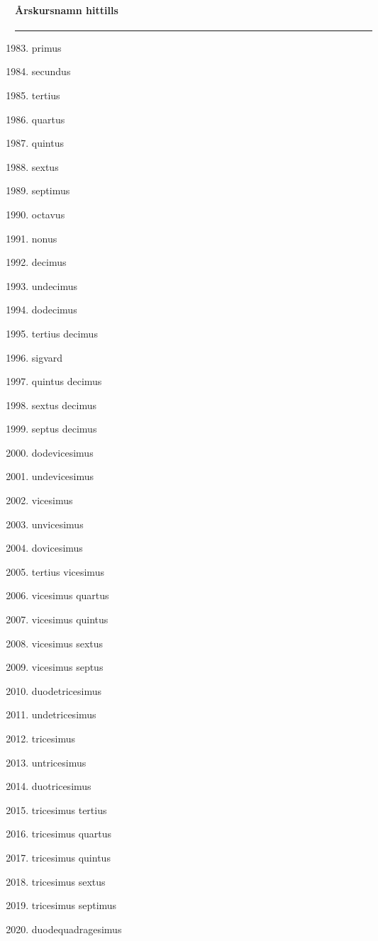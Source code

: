 \begin{song}
\begin{songnotes}
\paragraph{Årskursnamn hittills}
\rule{\textwidth}{0pt}
\begin{multicols}{2}
\begin{enumerate}
\setcounter{enumi}{1982}
\setlength{\itemsep}{0cm}
\setlength{\parskip}{0cm}
\item primus
\item secundus
\item tertius
\item quartus
\item quintus
\item sextus
\item septimus
\item octavus
\item nonus
\item decimus
\item undecimus
\item dodecimus
\item tertius decimus
\item sigvard
\item quintus decimus
\item sextus decimus
\item septus decimus
\item dodevicesimus
\item undevicesimus
\item vicesimus
\item unvicesimus
\item dovicesimus
\item tertius vicesimus
\item vicesimus quartus
\item vicesimus quintus
\item vicesimus sextus
\item vicesimus septus
\item duodetricesimus
\item undetricesimus
\item tricesimus
\item untricesimus
\item duotricesimus
\item tricesimus tertius
\item tricesimus quartus
\item tricesimus quintus
\item tricesimus sextus
\item tricesimus septimus
\item duodequadragesimus
\end{enumerate}
\end{multicols}
\end{songnotes}

\end{song}
